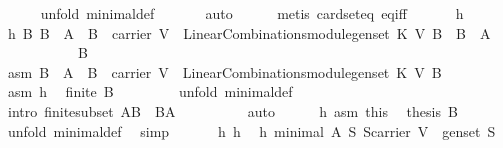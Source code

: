 \begin{isabellebody}
\ \ \ \ \isamarkupfalse%
\ {\isacharparenleft}unfold\ minimal{\isacharunderscore}def{\isacharparenright}\ \isanewline
\ \ \ \ \isamarkupfalse%
\ auto\isanewline
\ \ \ \ \isamarkupfalse%
\ {\isacharparenleft}metis\ card{\isacharunderscore}seteq\ eq{\isacharunderscore}iff{\isacharparenright}\isanewline
\ \ \isanewline
\ \ \isamarkupfalse%
\ h{}\ \isamarkupfalse%
\ h{\isacharcolon}\ {\isachardoublequoteopen}{\isasymAnd}B{\isachardot}\ B\ {\isasymsubseteq}\ A\ {\isasymand}\ B\ {\isasymsubseteq}\ carrier\ V\ {\isasymand}\ LinearCombinations{\isachardot}module{\isachardot}gen{\isacharunderscore}set\ K\ V\ B\ {\isasymLongrightarrow}\ B\ {\isacharequal}\ A{\isachardoublequoteclose}\isanewline
\ \ \isamarkupfalse%
\ {\isacharminus}\ \isanewline
\ \ \ \ \isamarkupfalse%
\ B\isanewline
\ \ \ \ \isamarkupfalse%
\ asm{\isacharcolon}\ {\isachardoublequoteopen}B\ {\isasymsubseteq}\ A\ {\isasymand}\ B\ {\isasymsubseteq}\ carrier\ V\ {\isasymand}\ LinearCombinations{\isachardot}module{\isachardot}gen{\isacharunderscore}set\ K\ V\ B{\isachardoublequoteclose}\ \isanewline
\ \ \ \ \isamarkupfalse%
\ asm\ h{}\ \isamarkupfalse%
\ {\isachardoublequoteopen}finite\ B{\isachardoublequoteclose}\ \isanewline
\ \ \ \ \ \ \isamarkupfalse%
\ {\isacharparenleft}unfold\ minimal{\isacharunderscore}def{\isacharparenright}\ \isanewline
\ \ \ \ \ \ \ \isamarkupfalse%
\ {\isacharparenleft}intro\ finite{\isacharunderscore}subset{\isacharbrackleft}\ {\isacharquery}A{\isacharequal}{\isachardoublequoteopen}B{\isachardoublequoteclose}\ \ {\isacharquery}B{\isacharequal}{\isachardoublequoteopen}A{\isachardoublequoteclose}{\isacharbrackright}{\isacharparenright}\ \isanewline
\ \ \ \ \ \ \ \isamarkupfalse%
\ auto\isanewline
\ \ \ \ \isamarkupfalse%
\ h{}\ asm\ this\ \isamarkupfalse%
\ {\isachardoublequoteopen}{\isacharquery}thesis\ B{\isachardoublequoteclose}\ \isamarkupfalse%
\ {\isacharparenleft}unfold\ minimal{\isacharunderscore}def{\isacharparenright}\ \isamarkupfalse%
\ simp\isanewline
\ \ \isamarkupfalse%
\isanewline
\ \ \isamarkupfalse%
\ h{}\ h\ \isamarkupfalse%
\ h{}{\isacharcolon}\ {\isachardoublequoteopen}minimal\ A\ {\isacharparenleft}{\isasymlambda}S{\isachardot}\ S{\isasymsubseteq}carrier\ V\ {\isasymand}\ gen{\isacharunderscore}set\ S{\isacharparenright}{\isachardoublequoteclose}\ \isanewline

\end{isabellebody}
